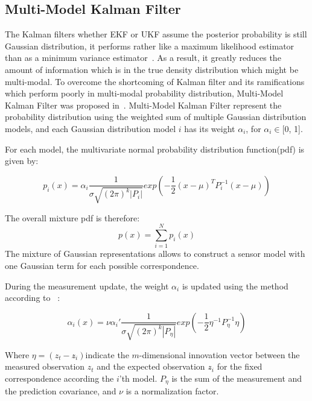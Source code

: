 \subsection{Multi-Model Kalman Filter}
The Kalman filters whether \gls{EKF} or \gls{UKF} assume the posterior probability is still Gaussian distribution, it performs rather like a maximum likelihood estimator than as a minimum variance estimator~\cite{alspach1972nonlinear}. As a result, it greatly reduces the amount of information which is in the true density distribution which might be multi-modal. To overcome the shortcoming of Kalman filter and its ramifications which perform poorly in multi-modal probability distribution, Multi-Model Kalman Filter was proposed in~\cite{alspach1972nonlinear}. Multi-Model Kalman Filter represent the probability distribution using the weighted sum of multiple Gaussian distribution models, and each Gaussian distribution model $i$ has its weight $\alpha_i$, for $\alpha_i \in $[0, 1].

For each model, the multivariate normal probability distribution function(pdf) is given by:

$$p_{i}(x) = \alpha_i\frac{1}{\sigma \sqrt {(2\pi)^k|P_i|}}exp(-\frac{1}{2}(x-\mu)^TP_i^{-1}(x-\mu))$$

The overall mixture pdf is therefore:
$$p(x) = \sum_{i=1}^{N}p_i(x)$$
The mixture of Gaussian representations allows to construct a sensor model with one Gaussian term for each possible correspondence.

During the measurement update, the weight $\alpha_i$ is updated using the method according to ~\cite{alspach1972nonlinear}:

$$\alpha_{i}(x) = \nu\alpha_i'\frac{1}{\sigma \sqrt {(2\pi)^k|P_\eta|}}exp(-\frac{1}{2}\eta^{-1}P_\eta^{-1}\eta)$$

Where $\eta = (z_t - z\widehat{}_i)$indicate the $m$-dimensional innovation vector between the measured observation $z_t$ and the expected observation $z\widehat{}_i$ for the fixed correspondence according the $i$'th model. $P_\eta$ is the sum of the measurement and the prediction covariance, and $\nu$ is a normalization factor.

